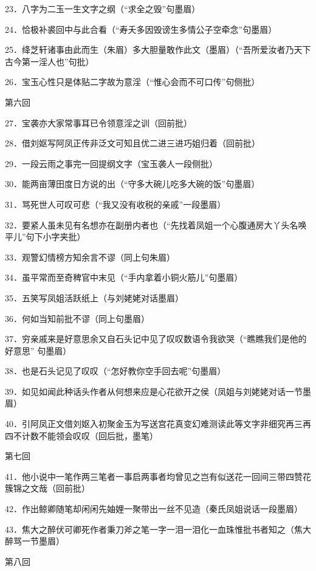 23．八字为二玉一生文字之纲{（\kaishu “求全之毁”句墨眉）}

24．恰极补裘回中与此合看{（\kaishu “寿夭多因毁谤生多情公子空牵念”句墨眉）}

25．绛芝轩诸事由此而生{（\kaishu 朱眉）}多大胆量敢作此文{（\kaishu 墨眉）（“吾所爱汝者乃天下古今第一淫人也”句批）}

26．宝玉心性只是体贴二字故为意淫{（\kaishu “惟心会而不可口传”句侧批）}

第六回

27．宝袭亦大家常事耳已令领意淫之训{（\kaishu 回前批）}

28．借刘妪写阿凤正传非泛文可知且优二进三进巧姐归着{（\kaishu 回前批）}

29．一段云雨之事完一回提纲文字{（\kaishu 宝玉袭人一段侧批）}

30．能两亩薄田度日方说的出{（\kaishu “守多大碗儿吃多大碗的饭”句墨眉）}

31．骂死世人可叹可悲{（\kaishu “我又没有收税的亲戚”一段墨眉）}

32．要紧人虽未见有名想亦在副册内者也{（\kaishu “先找着凤姐一个心腹通房大丫头名唤平儿”句下小字夹批）}

33．观警幻情榜方知余言不谬{（\kaishu 同上句朱眉）}

34．虽平常而至奇稗官中末见{（\kaishu “手内拿着小铜火筋儿”句墨眉）}

35．五笑写凤姐活跃纸上{（\kaishu 与刘姥姥对话墨眉）}

36．何如当知前批不谬{（\kaishu 同上句墨眉）}

37．穷亲戚来是好意思余又自石头记中见了叹叹数语令我欲哭{（\kaishu “瞧瞧我们是他的好意思”
句墨眉）}

38．也是石头记见了叹叹{（\kaishu “怎好教你空手回去呢”句墨眉）}

39．如见如闻此种话头作者从何想来应是心花欲开之侯{（\kaishu 凤姐与刘姥姥对话一节墨眉）}

40．引阿凤正文借刘妪入初聚金玉为写送宫花真变幻难测读此等文字非细究再三再四不计数不能领会叹叹{（\kaishu 回后批，墨笔）}

第七回

41．他小说中一笔作两三笔者一事启两事者均曾见之岂有似送花一回间三带四赞花簇锦之文哉{（\kaishu 回前批）}

42．作出鲸卿随笔却闲闲先妯娌一聚带出一丝不见造{（\kaishu 秦氏凤姐说话一段墨眉）}

43．焦大之醉伏可卿死作者秉刀斧之笔一字一泪一泪化一血珠惟批书者知之{（\kaishu 焦大醉骂一节墨眉）}

第八回

